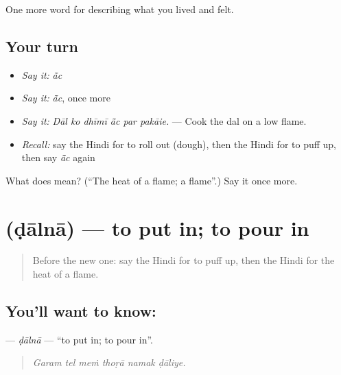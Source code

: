 \begin{grammarlens}[title={What you've built}]
One more word for describing what you lived and felt.
\end{grammarlens}

\subsection*{Your turn}
\begin{itemize}
\raggedright
  \item \emph{Say it:} \emph{ā̃c}
  \item \emph{Say it:} \emph{ā̃c}, once more
  \item \emph{Say it:} \emph{Dāl ko dhīmī ā̃c par pakāie.} — Cook the dal on a low flame.
  \item \emph{Recall:} say the Hindi for to roll out (dough), then the Hindi for to puff up, then say \emph{ā̃c} again
\end{itemize}

\begin{tcolorbox}[breakable,colback=teal!4,colframe=teal!35!black,title={Before you move on}]
What does  mean? (\textquotedblleft{}The heat of a flame; a flame\textquotedblright{}.) Say it once more.
\end{tcolorbox}
\section[\texorpdfstring{\hi{डालना} (ḍālnā)}{डालना (ḍālnā)}]{ (ḍālnā) — to put in; to pour in}

\label{lesson:HI-C521-dalna}



\begin{quote}
Before the new one: say the Hindi for to puff up, then the Hindi for the heat of a flame.
\end{quote}

\subsection*{You'll want to know: }
\textbf{} — \emph{ḍālnā} — \textquotedblleft{}to put in; to pour in\textquotedblright{}.

\begin{quote}
     
\end{quote}

\begin{quote}
\emph{Garam tel meṁ thoṛā namak ḍāliye.}
\end{quote}

